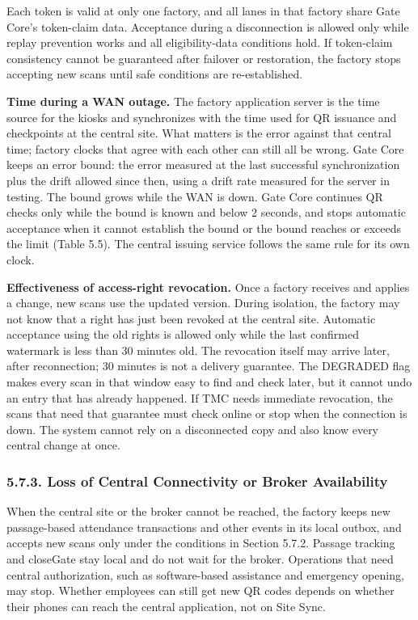 Each token is valid at only one factory, and all lanes in that factory share Gate Core's token-claim data. Acceptance during a disconnection is allowed only while replay prevention works and all eligibility-data conditions hold. If token-claim consistency cannot be guaranteed after failover or restoration, the factory stops accepting new scans until safe conditions are re-established.


\textbf{Time during a WAN outage.} The factory application server is the time source for the kiosks and synchronizes with the time used for QR issuance and checkpoints at the central site. What matters is the error against that central time; factory clocks that agree with each other can still all be wrong. Gate Core keeps an error bound: the error measured at the last successful synchronization plus the drift allowed since then, using a drift rate measured for the server in testing. The bound grows while the WAN is down. Gate Core continues QR checks only while the bound is known and below 2 seconds, and stops automatic acceptance when it cannot establish the bound or the bound reaches or exceeds the limit (Table 5.5). The central issuing service follows the same rule for its own clock.


\textbf{Effectiveness of access-right revocation.} Once a factory receives and applies a change, new scans use the updated version. During isolation, the factory may not know that a right has just been revoked at the central site. Automatic acceptance using the old rights is allowed only while the last confirmed watermark is less than 30 minutes old. The revocation itself may arrive later, after reconnection; 30 minutes is not a delivery guarantee. The DEGRADED flag makes every scan in that window easy to find and check later, but it cannot undo an entry that has already happened. If TMC needs immediate revocation, the scans that need that guarantee must check online or stop when the connection is down. The system cannot rely on a disconnected copy and also know every central change at once.

\subsubsection*{5.7.3. Loss of Central Connectivity or Broker Availability}

{}

When the central site or the broker cannot be reached, the factory keeps new passage-based attendance transactions and other events in its local outbox, and accepts new scans only under the conditions in Section 5.7.2. Passage tracking and closeGate stay local and do not wait for the broker. Operations that need central authorization, such as software-based assistance and emergency opening, may stop. Whether employees can still get new QR codes depends on whether their phones can reach the central application, not on Site Sync.


